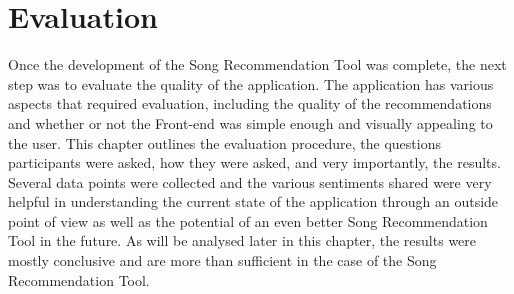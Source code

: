 \documentclass{l4proj}
\begin{document}
\chapter{Evaluation} 
Once the development of the Song Recommendation Tool was complete, the next step was to evaluate the quality of the application. The application has various aspects that required evaluation, including the quality of the recommendations and whether or not the Front-end was simple enough and visually appealing to the user. This chapter outlines the evaluation procedure, the questions participants were asked, how they were asked, and very importantly, the results. Several data points were collected and the various sentiments shared were very helpful in understanding the current state of the application through an outside point of view as well as the potential of an even better Song Recommendation Tool in the future. As will be analysed later in this chapter, the results were mostly conclusive and are more than sufficient in the case of the Song Recommendation Tool. 
\end{document}
